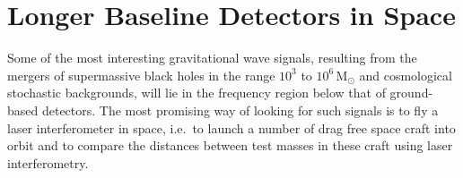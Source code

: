\documentclass{article}
\begin{document}




\newpage

\section{Longer Baseline Detectors in Space}
\label{section:space}

Some of the most interesting gravitational wave signals, resulting from the
mergers of supermassive black holes in the range $10^3$ to $10^6$\,M$_{\odot}$
and cosmological stochastic backgrounds, will lie in the frequency region below
that of ground-based detectors. The most promising way of looking for such
signals is to fly a laser interferometer in space, i.e.\ to launch a number of
drag free space craft into orbit and to compare the distances between test
masses in these craft using laser interferometry.
\end{document}
